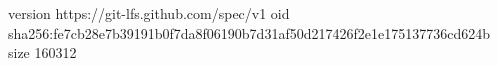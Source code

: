 version https://git-lfs.github.com/spec/v1
oid sha256:fe7cb28e7b39191b0f7da8f06190b7d31af50d217426f2e1e175137736cd624b
size 160312
